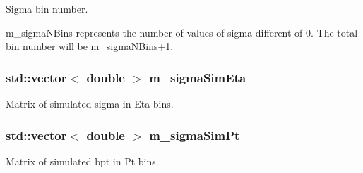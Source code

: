 Sigma bin number. 

m\+\_\+sigma\+N\+Bins represents the number of values of sigma different of 0. The total bin number will be m\+\_\+sigma\+N\+Bins+1. \hypertarget{classTemplateMethod_1_1Setting_ae68c7131daddbc2abb2c29b670a67d32}{
\subsubsection[{m\+\_\+sigma\+Sim\+Eta}]{\setlength{\rightskip}{0pt plus 5cm}std\+::vector$<$ double $>$ m\+\_\+sigma\+Sim\+Eta\hspace{0.3cm}{\ttfamily [private]}}}\label{classTemplateMethod_1_1Setting_ae68c7131daddbc2abb2c29b670a67d32}


Matrix of simulated sigma in Eta bins. 

\hypertarget{classTemplateMethod_1_1Setting_ae08f5a1393cd6844bfb2d25321c3c8a5}{
\subsubsection[{m\+\_\+sigma\+Sim\+Pt}]{\setlength{\rightskip}{0pt plus 5cm}std\+::vector$<$ double $>$ m\+\_\+sigma\+Sim\+Pt\hspace{0.3cm}{\ttfamily [private]}}}\label{classTemplateMethod_1_1Setting_ae08f5a1393cd6844bfb2d25321c3c8a5}


Matrix of simulated bpt in Pt bins. 

